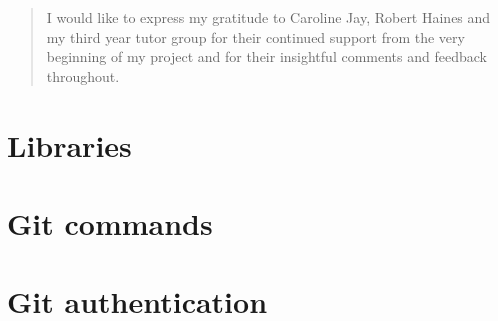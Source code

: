 \documentclass[a4paper]{report}
\begin{document}
\newcommand{\fig}[4]{

\begin{figure} 
    \centering
    \texttt{[image: \#1]}
    \caption{#2}
    \label{#3}
\end{figure}


}




\begin{abstract}

\end{abstract}

\renewcommand{\abstractname}{Acknowledgements}
\begin{abstract}
I would like to express my gratitude to Caroline Jay, Robert Haines and my third year tutor group for their continued support from the very beginning of my project and for their insightful comments and feedback throughout.

\end{abstract}

\tableofcontents







\begin{appendices}

\chapter{Libraries}\label{appendix_libraries}



\chapter{Git commands}\label{appendix_plumbing}



\chapter{Git authentication}\label{appendix_gitauth}




\end{appendices}



\end{document}
